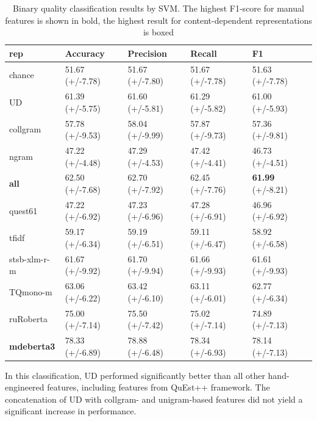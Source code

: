 \begin{table}[H]
	\centering
	\begin{tabular}{l|llll}
		\toprule
		rep      & Accuracy         & Precision        & Recall           & F1               \\
		\midrule
		chance          & 51.67 (+/-7.78) & 51.67 (+/-7.80) & 51.67 (+/-7.78) & 51.63 (+/-7.78) \\
		\midrule
		UD              & 61.39 (+/-5.75) & 61.60 (+/-5.81) & 61.29 (+/-5.82) & 61.00 (+/-5.93) \\
		collgram        & 57.78 (+/-9.53) & 58.04 (+/-9.99) & 57.87 (+/-9.73) & 57.36 (+/-9.81) \\
		ngram           & 47.22 (+/-4.48) & 47.29 (+/-4.53) & 47.42 (+/-4.41) & 46.73 (+/-4.51) \\
		\textbf{all}             & 62.50 (+/-7.68) & 62.70 (+/-7.92) & 62.45 (+/-7.76) & \textbf{61.99} (+/-8.21) \\
		\midrule
		quest61         & 47.22 (+/-6.92) & 47.23 (+/-6.96) & 47.28 (+/-6.91) & 46.96 (+/-6.92) \\
		\midrule
		tfidf           & 59.17 (+/-6.34) & 59.19 (+/-6.51) & 59.11 (+/-6.47) & 58.92 (+/-6.58) \\
		stsb-xlm-r-m          & 61.67 (+/-9.92) & 61.70 (+/-9.94) & 61.66 (+/-9.93) & 61.61 (+/-9.93) \\
		TQmono-m        & 63.06 (+/-6.22) & 63.42 (+/-6.10) & 63.11 (+/-6.01) & 62.77 (+/-6.34) \\
		ruRoberta & 75.00 (+/-7.14) & 75.50 (+/-7.42) & 75.02 (+/-7.14) & 74.89 (+/-7.13) \\
		\textbf{mdeberta3}  & 78.33 (+/-6.89) & 78.88 (+/-6.48) & 78.34 (+/-6.93) & \boxit{0.4in}78.14 (+/-7.13)\\
		\bottomrule
	\end{tabular}
	\caption{\label{tab:bad-good}Binary quality classification results by SVM. The highest F1-score for manual features is shown in bold, the highest result for content-dependent representations is boxed}
\end{table}
In this classification, UD performed significantly better than all other hand-engineered features, including features from QuEst++ framework. The concatenation of UD with collgram- and unigram-based features did not yield a significant increase in performance. 

